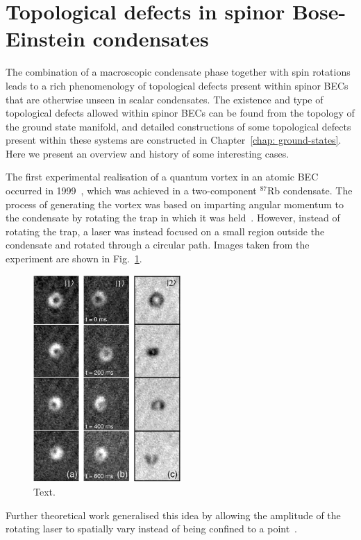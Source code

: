 \section{Topological defects in spinor Bose-Einstein condensates}
The combination of a macroscopic condensate phase together with spin rotations
leads to a rich phenomenology of topological defects present within spinor BECs
that are otherwise unseen in scalar condensates.
The existence and type of topological defects allowed within spinor BECs can be
found from the topology of the ground state manifold, and detailed constructions
of some topological defects present within these systems
are constructed in Chapter~\ref{chap: ground-states}.
Here we present an overview and history of some interesting cases.

The first experimental realisation of a quantum vortex in an atomic BEC occurred
in 1999~\cite{Matthews1999}, which was achieved in a two-component \(^{87}\)Rb
condensate.
The process of generating the vortex was based on imparting angular momentum
to the condensate by rotating the trap in which it was held~\cite{Williams1999}.
However, instead of rotating the trap, a laser was instead focused on a small
region outside the condensate and rotated through a circular path.
Images taken from the experiment are shown in Fig.~\ref{fig: first-vortex}.
\begin{figure}
    \centering
    \includegraphics[width=0.5\textwidth]
    {gfx/ch-introduction/first_quantum_vortex.png}
    \caption[Experimental images of a quantum vortex in an atomic BEC]
    {\label{fig: first-vortex}Text.}
\end{figure}
Further theoretical work generalised this idea by allowing the amplitude of the
rotating laser to spatially vary instead of being confined to a
point~\cite{Ruostekoski2000}.

